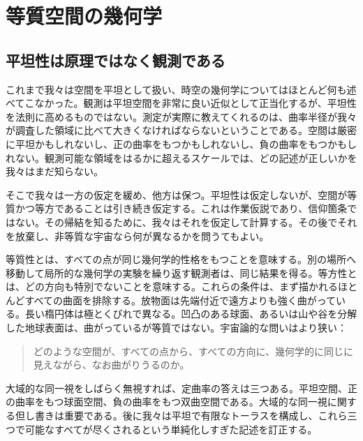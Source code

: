\chapter{等質空間の幾何学}


\section{平坦性は原理ではなく観測である}

これまで我々は空間を平坦として扱い、時空の幾何学についてはほとんど何も述べてこなかった。観測は平坦空間を非常に良い近似として正当化するが、平坦性を法則に高めるものではない。測定が実際に教えてくれるのは、曲率半径が我々が調査した領域に比べて大きくなければならないということである。空間は厳密に平坦かもしれないし、正の曲率をもつかもしれないし、負の曲率をもつかもしれない。観測可能な領域をはるかに超えるスケールでは、どの記述が正しいかを我々はまだ知らない。

そこで我々は一方の仮定を緩め、他方は保つ。平坦性は仮定しないが、空間が等質かつ等方であることは引き続き仮定する。これは作業仮説であり、信仰箇条ではない。その帰結を知るために、我々はそれを仮定して計算する。その後でそれを放棄し、非等質な宇宙なら何が異なるかを問うてもよい。

等質性とは、すべての点が同じ幾何学的性格をもつことを意味する。別の場所へ移動して局所的な幾何学の実験を繰り返す観測者は、同じ結果を得る。等方性とは、どの方向も特別でないことを意味する。これらの条件は、まず描かれるほとんどすべての曲面を排除する。放物面は先端付近で遠方よりも強く曲がっている。長い楕円体は極とくびれで異なる。凹凸のある球面、あるいは山や谷を分解した地球表面は、曲がっているが等質ではない。宇宙論的な問いはより狭い：
\begin{quote}
どのような空間が、すべての点から、すべての方向に、幾何学的に同じに見えながら、なお曲がりうるのか。
\end{quote}

大域的な同一視をしばらく無視すれば、定曲率の答えは三つある。平坦空間、正の曲率をもつ球面空間、負の曲率をもつ双曲空間である。大域的な同一視に関する但し書きは重要である。後に我々は平坦で有限なトーラスを構成し、これら三つで可能なすべてが尽くされるという単純化しすぎた記述を訂正する。

